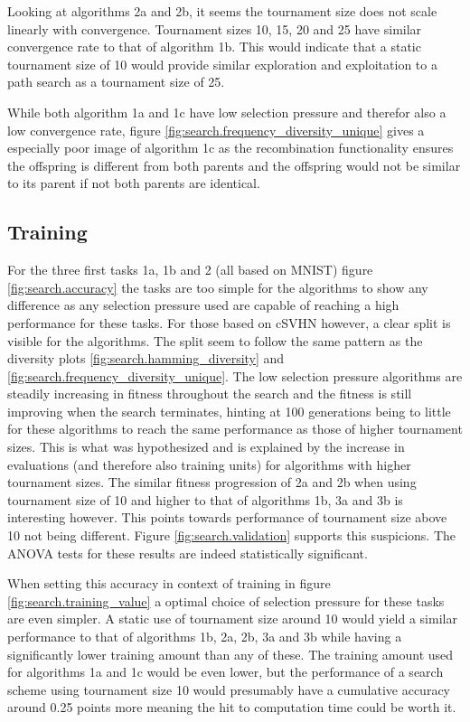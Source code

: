 Looking at algorithms 2a and 2b, it seems the tournament size does not scale linearly with convergence. Tournament sizes 10, 15, 20 and 25 have similar convergence rate to that of algorithm 1b. This would indicate that a static tournament size of 10 would provide similar exploration and exploitation to a path search as a tournament size of 25. 

While both algorithm 1a and 1c have low selection pressure and therefor also a low convergence rate, figure \ref{fig:search.frequency_diversity_unique} gives a especially poor image of algorithm 1c as the recombination functionality ensures the offspring is different from both parents and the offspring would not be similar to its parent if not both parents are identical. 

\subsection{Training}
For the three first tasks 1a, 1b and 2 (all based on MNIST) figure \ref{fig:search.accuracy} the tasks are too simple for the algorithms to show any difference as any selection pressure used are capable of reaching a high performance for these tasks. For those based on cSVHN however, a clear split is visible for the algorithms. The split seem to follow the same pattern as the diversity plots \ref{fig:search.hamming_diversity} and \ref{fig:search.frequency_diversity_unique}. The low selection pressure algorithms are steadily increasing in fitness throughout the search and the fitness is still improving when the search terminates, hinting at 100 generations being to little for these algorithms to reach the same performance as those of higher tournament sizes. This is what was hypothesized and is explained by the increase in evaluations (and therefore also training units) for algorithms with higher tournament sizes. The similar fitness progression of 2a and 2b when using tournament size of 10 and higher to that of algorithms 1b, 3a and 3b is interesting however. This points towards performance of tournament size above 10 not being different. Figure \ref{fig:search.validation} supports this suspicions. The ANOVA tests for these results are indeed statistically significant.

When setting this accuracy in context of training in figure \ref{fig:search.training_value} a optimal choice of selection pressure for these tasks are even simpler. A static use of tournament size around 10 would yield a similar performance to that of algorithms 1b, 2a, 2b, 3a and 3b while having a significantly lower training amount than any of these. The training amount used for algorithms 1a and 1c would be even lower, but the performance of a search scheme using tournament size 10 would presumably have a cumulative accuracy around 0.25 points more meaning the hit to computation time could be worth it.  

